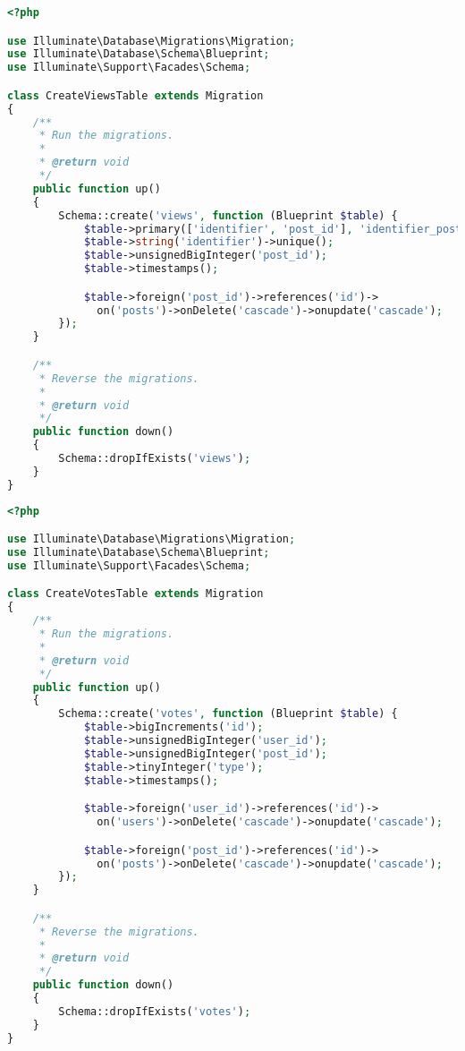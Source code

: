 \documentclass[11pt, oneside]{article}   	%
\begin{document}
\begin{lstlisting}[showstringspaces=false, title=CreateViewsTable.java, language=PHP, frame=single]
<?php

use Illuminate\Database\Migrations\Migration;
use Illuminate\Database\Schema\Blueprint;
use Illuminate\Support\Facades\Schema;

class CreateViewsTable extends Migration
{
    /**
     * Run the migrations.
     *
     * @return void
     */
    public function up()
    {
        Schema::create('views', function (Blueprint $table) {
            $table->primary(['identifier', 'post_id'], 'identifier_post');
            $table->string('identifier')->unique();
            $table->unsignedBigInteger('post_id');
            $table->timestamps();

            $table->foreign('post_id')->references('id')->
              on('posts')->onDelete('cascade')->onupdate('cascade');
        });
    }

    /**
     * Reverse the migrations.
     *
     * @return void
     */
    public function down()
    {
        Schema::dropIfExists('views');
    }
}
\end{lstlisting}

\begin{lstlisting}[showstringspaces=false, title=CreateVotesTable.java, language=PHP, frame=single]
<?php

use Illuminate\Database\Migrations\Migration;
use Illuminate\Database\Schema\Blueprint;
use Illuminate\Support\Facades\Schema;

class CreateVotesTable extends Migration
{
    /**
     * Run the migrations.
     *
     * @return void
     */
    public function up()
    {
        Schema::create('votes', function (Blueprint $table) {
            $table->bigIncrements('id');
            $table->unsignedBigInteger('user_id');
            $table->unsignedBigInteger('post_id');
            $table->tinyInteger('type');
            $table->timestamps();

            $table->foreign('user_id')->references('id')->
              on('users')->onDelete('cascade')->onupdate('cascade');

            $table->foreign('post_id')->references('id')->
              on('posts')->onDelete('cascade')->onupdate('cascade');
        });
    }

    /**
     * Reverse the migrations.
     *
     * @return void
     */
    public function down()
    {
        Schema::dropIfExists('votes');
    }
}
\end{lstlisting}
\end{document}
